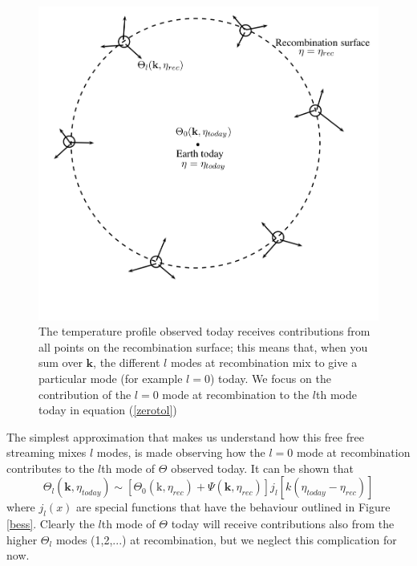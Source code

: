 \documentclass[11pt, a4paper,oneside,openright]{book}
\numberwithin{equation}{section}
\begin{document}
\begin{figure}
\begin{center}
\includegraphics[scale=0.6]{CMB/stream}
\end{center}
\caption{The temperature profile observed today receives contributions from all points on the recombination surface; this means that, when you sum over
$\mathbf{k}$, the different $l$ modes at recombination mix to give a particular mode (for example $l=0$) today. We focus on the contribution of the $l=0$ mode at recombination to the $l$th mode today in equation (\ref{zerotol})}
\label{convol}
\end{figure}
The simplest approximation that makes us understand how this free free streaming mixes $l$ modes, is made observing how the  $l=0$ mode at recombination contributes to the $l$th mode of $\Theta$ observed today. It can be shown that 
\begin{equation}
\label{zerotol}
\Theta_l(\mathbf{k},\eta_{today})\sim[\Theta_0(\mathrm{k},\eta_{rec})+\Psi(\mathbf{k},\eta_{rec})]j_l[k(\eta_{today}-\eta_{rec})]
\end{equation} 
where $j_l(x)$ are special functions that have the behaviour outlined in Figure \ref{bess}. Clearly the $l$th mode of $\Theta$ today will receive contributions also from the higher $\Theta_l$ modes (1,2,...) at recombination, but we neglect this complication for now. 
\end{document}
